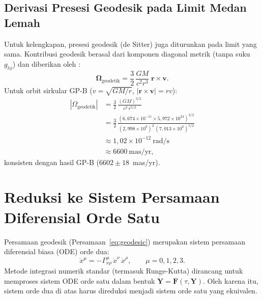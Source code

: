 \subsection{Derivasi Presesi Geodesik pada Limit Medan Lemah}
\label{subsec:derivasi-geodesik-wf}

Untuk kelengkapan, presesi geodesik (de Sitter) juga diturunkan
pada limit yang sama.
Kontribusi geodesik berasal dari komponen diagonal metrik
(tanpa suku $g_{t\phi}$) dan diberikan oleh \parencite{Will2014Confrontation}:
\begin{equation}
    \bm{\Omega}_{\text{geodetik}}
    = \frac{3}{2}\,\frac{GM}{c^2 r^3}\;\mathbf{r} \times \mathbf{v}.
    \label{eq:omega-geo-wf}
\end{equation}
Untuk orbit sirkular GP-B ($v = \sqrt{GM/r}$, $|\mathbf{r} \times \mathbf{v}| = rv$):
\begin{equation}
\begin{aligned}
    |\Omega_{\text{geodetik}}|
    &= \frac{3}{2}\,\frac{(GM)^{3/2}}{c^2\, r^{5/2}} \\[4pt]
    &= \frac{3}{2}\,\frac{(6{,}674 \times 10^{-11} \times 5{,}972 \times 10^{24})^{3/2}}
           {(2{,}998 \times 10^8)^2\,(7{,}013 \times 10^6)^{5/2}} \\[4pt]
    &\approx 1{,}02 \times 10^{-12}~\text{rad/s} \\[4pt]
    &\approx 6600~\text{mas/yr},
\end{aligned}
    \label{eq:omega-geo-numeric}
\end{equation}
konsisten dengan hasil GP-B ($6602 \pm 18$~mas/yr).



\section{Reduksi ke Sistem Persamaan Diferensial Orde Satu}
\label{sec:reduksi-ode}

Persamaan geodesik (Persamaan~\ref{eq:geodesic}) merupakan
sistem persamaan diferensial biasa (ODE) orde dua:
\begin{equation}
    \ddot{x}^\mu = -\Gamma^\mu_{\nu\rho}\,\dot{x}^\nu\,\dot{x}^\rho,
    \qquad \mu = 0, 1, 2, 3.
    \label{eq:geodesic-ode2}
\end{equation}
Metode integrasi numerik standar (termasuk Runge-Kutta)
dirancang untuk memproses sistem ODE orde satu dalam bentuk
$\dot{\mathbf{Y}} = \mathbf{F}(\tau, \mathbf{Y})$.
Oleh karena itu, sistem orde dua di atas harus direduksi
menjadi sistem orde satu yang ekuivalen.


